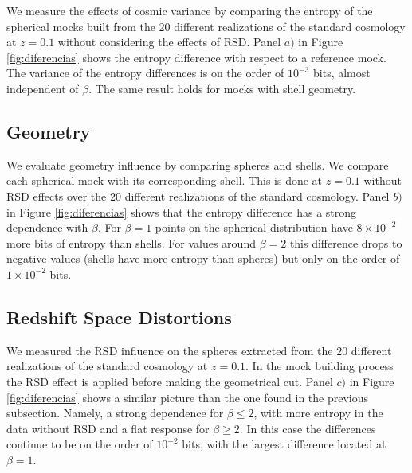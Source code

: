 \documentclass[fleqn,usenatbib]{mnras}
\begin{document}
We measure the effects of cosmic variance by comparing the entropy of the spherical 
mocks built from the $20$ different realizations of the standard
cosmology at $z=0.1$ without considering the effects of RSD.  
Panel $a)$ in Figure \ref{fig:diferencias} shows the entropy
difference with respect to a reference mock. The variance of the
entropy differences is on the order of $10^{-3}$ bits, almost
independent of $\beta$. 
The same result holds for mocks with shell geometry.



\subsection{Geometry}

We evaluate geometry influence by comparing spheres and shells.
We compare each spherical mock with its corresponding shell.
This is done at $z=0.1$ without RSD effects over the $20$ different realizations
of the standard cosmology.
Panel $b)$ in Figure \ref{fig:diferencias} shows that the entropy
difference has a strong dependence with $\beta$.  
For $\beta=1$ points on the spherical distribution have $8\times
10^{-2}$ more bits of entropy than shells. 
For values around $\beta=2$ this difference drops to negative values
(shells have more entropy than spheres) but only on the order of
$1\times10^{-2}$ bits. 




\subsection{Redshift Space Distortions}

We measured the RSD influence on the spheres extracted from the $20$ different realizations of the standard cosmology at $z=0.1$.
In the mock building process the RSD effect is applied before making the geometrical cut.
Panel $c)$ in Figure \ref{fig:diferencias} shows a similar picture than the one found in the previous subsection.
Namely, a strong dependence for $\beta\leq 2$, with more entropy in the data without RSD and a flat response for $\beta\geq 2$.
In this case the differences continue to be on the order of $10^{-2}$ bits, with the
largest difference located at $\beta=1$.
\end{document}
